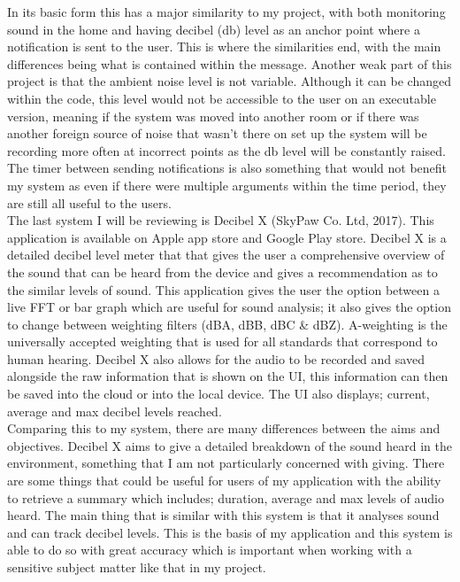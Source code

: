 \documentclass[a4paper,11pt]{report}
\begin{document}
In its basic form this has a major similarity to my project, with both monitoring sound in the home and having decibel (db) level as an anchor point where a notification is sent to the user. This is where the similarities end, with the main differences being what is contained within the message. Another weak part of this project is that the ambient noise level is not variable. Although it can be changed within the code, this level would not be accessible to the user on an executable version, meaning if the system was moved into another room or if there was another foreign source of noise that wasn’t there on set up the system will be recording more often at incorrect points as the db level will be constantly raised. The timer between sending notifications is also something that would not benefit my system as even if there were multiple arguments within the time period, they are still all useful to the users.\\

The last system I will be reviewing is Decibel X (SkyPaw Co. Ltd, 2017). This application is available on Apple app store and Google Play store. Decibel X is a detailed decibel level meter that that gives the user a comprehensive overview of the sound that can be heard from the device and gives a recommendation as to the similar levels of sound. This application gives the user the option between a live FFT or bar graph which are useful for sound analysis; it also gives the option to change between weighting filters (dBA, dBB, dBC \& dBZ). A-weighting is the universally accepted weighting that is used for all standards that correspond to human hearing. Decibel X also allows for the audio to be recorded and saved alongside the raw information that is shown on the UI, this information can then be saved into the cloud or into the local device. The UI also displays; current, average and max decibel levels reached.\\

Comparing this to my system, there are many differences between the aims and objectives. Decibel X aims to give a detailed breakdown of the sound heard in the environment, something that I am not particularly concerned with giving. There are some things that could be useful for users of my application with the ability to retrieve a summary which includes; duration, average and max levels of audio heard. The main thing that is similar with this system is that it analyses sound and can track decibel levels. This is the basis of my application and this system is able to do so with great accuracy which is important when working with a sensitive subject matter like that in my project.\\
\end{document}
